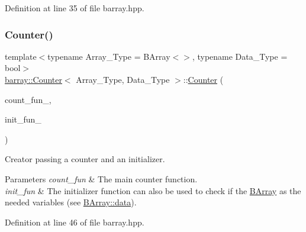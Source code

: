 Definition at line 35 of file barray.\+hpp.

\mbox{\label{classbarray_1_1_counter_a85cf71665d85384afcd672f28408b389}} 
\subsubsection{\texorpdfstring{Counter()}{Counter()}\hspace{0.1cm}{\footnotesize\ttfamily [3/3]}}
{\footnotesize\ttfamily template$<$typename Array\+\_\+\+Type  = B\+Array$<$$>$, typename Data\+\_\+\+Type  = bool$>$ \\
\hyperlink{classbarray_1_1_counter}{barray\+::\+Counter}$<$ Array\+\_\+\+Type, Data\+\_\+\+Type $>$\+::\hyperlink{classbarray_1_1_counter}{Counter} (\begin{DoxyParamCaption}\item[{\hyperlink{namespacebarray_a94903bd0f37708633933ea88ac8e4c6a}{Counter\+\_\+fun\+\_\+type}$<$ Array\+\_\+\+Type, Data\+\_\+\+Type $>$}]{count\+\_\+fun\+\_\+,  }\item[{\hyperlink{namespacebarray_a94903bd0f37708633933ea88ac8e4c6a}{Counter\+\_\+fun\+\_\+type}$<$ Array\+\_\+\+Type, Data\+\_\+\+Type $>$}]{init\+\_\+fun\+\_\+ }\end{DoxyParamCaption})\hspace{0.3cm}{\ttfamily [inline]}}



Creator passing a counter and an initializer. 


\begin{DoxyParams}{Parameters}
{\em count\+\_\+fun} & The main counter function. \\
\hline
{\em init\+\_\+fun} & The initializer function can also be used to check if the {\ttfamily \hyperlink{classbarray_1_1_b_array}{B\+Array}} as the needed variables (see \hyperlink{class_b_array_a9576163b52124021575e50dbcca2f6b9}{B\+Array\+::data}). \\
\hline
\end{DoxyParams}


Definition at line 46 of file barray.\+hpp.

\mbox{\label{classbarray_1_1_counter_a9f44b2f1f6a4df5b36a9fb2479969e02}} 
